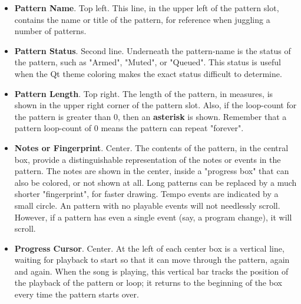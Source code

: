    \begin{itemize}
      \item \textbf{Pattern Name}. Top left.
         This line, in the upper left of the pattern slot, contains the name or
         title of the pattern, for reference when juggling a number of
         patterns.
      \item \textbf{Pattern Status}. Second line.
         Underneath the pattern-name is the status of the pattern, such as
         "Armed", "Muted", or "Queued".
         This status is useful when the Qt theme coloring makes the exact
         status difficult to determine.
      \item \textbf{Pattern Length}. Top right.
         The length of the pattern, in measures, is shown in the upper
         right corner of the pattern slot.
         Also, if the loop-count for the pattern is greater than 0, 
         then an \textbf{asterisk} is shown.
         Remember that a pattern loop-count of 0 means the pattern can repeat
         "forever".
      \item \textbf{Notes or Fingerprint}. Center.
         The contents of the pattern, in the central box,
         provide a distinguishable representation of the notes or events in the
         pattern.
         The notes are shown in the center, inside a "progress box" that
         can also be colored, or not shown at all.
         Long patterns can be replaced by a much shorter "fingerprint", for
         faster drawing.
         Tempo events are indicated by a small circle.
         An pattern with no playable events will not needlessly scroll.
         However, if a pattern has even a single event (say, a program change),
         it will scroll.
      \item \textbf{Progress Cursor}. Center.
         At the left of each center box is a vertical line, waiting for
         playback to start so that it can move through the pattern, again and
         again.
         When the song is playing, this vertical bar
         tracks the position of the playback of the pattern or loop; it
         returns to the beginning of the box every time the pattern starts
         over.

\end{itemize}
